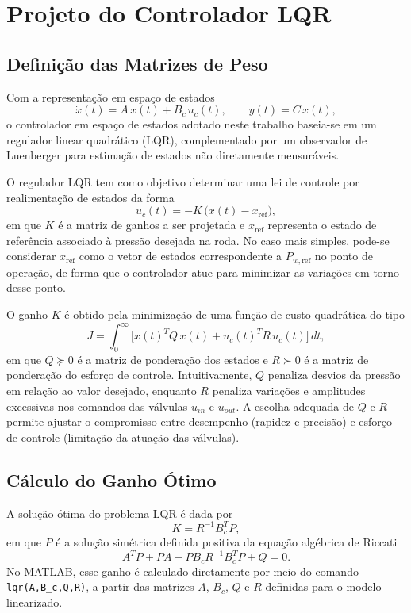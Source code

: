 \section{Projeto do Controlador LQR}
\label{sec:controle-lqr-luenberger}

\subsection{Definição das Matrizes de Peso}
\label{sec:definicao-matrizes-peso}

Com a representação em espaço de estados
\[
    \dot{x}(t) = A\,x(t) + B_c\,u_c(t), \qquad
    y(t) = C\,x(t),
\]
o controlador em espaço de estados adotado neste trabalho baseia-se em um regulador linear quadrático (LQR), complementado por um observador de Luenberger para estimação de estados não diretamente mensuráveis.

O regulador LQR tem como objetivo determinar uma lei de controle por realimentação de estados da forma
\[
    u_c(t) = -K\,\big(x(t) - x_{\text{ref}}\big),
\]
em que $K$ é a matriz de ganhos a ser projetada e $x_{\text{ref}}$ representa o estado de referência associado à pressão desejada na roda. No caso mais simples, pode-se considerar $x_{\text{ref}}$ como o vetor de estados correspondente a $P_{w,\text{ref}}$ no ponto de operação, de forma que o controlador atue para minimizar as variações em torno desse ponto.

O ganho $K$ é obtido pela minimização de uma função de custo quadrática do tipo
\[
    J = \int_{0}^{\infty}
        \Big[
            x(t)^{T} Q\,x(t)
            + u_c(t)^{T} R\,u_c(t)
        \Big]\,dt,
\]
em que $Q \succeq 0$ é a matriz de ponderação dos estados e $R \succ 0$ é a matriz de ponderação do esforço de controle. Intuitivamente, $Q$ penaliza desvios da pressão em relação ao valor desejado, enquanto $R$ penaliza variações e amplitudes excessivas nos comandos das válvulas $u_{in}$ e $u_{out}$. A escolha adequada de $Q$ e $R$ permite ajustar o compromisso entre desempenho (rapidez e precisão) e esforço de controle (limitação da atuação das válvulas).

\subsection{Cálculo do Ganho Ótimo}
\label{sec:calculo-ganho-otimo}

A solução ótima do problema LQR é dada por
\[
    K = R^{-1} B_c^{T} P,
\]
em que $P$ é a solução simétrica definida positiva da equação algébrica de Riccati
\[
    A^{T} P + P A - P B_c R^{-1} B_c^{T} P + Q = 0.
\]
No MATLAB, esse ganho é calculado diretamente por meio do comando \texttt{lqr(A,B\_c,Q,R)}, a partir das matrizes $A$, $B_c$, $Q$ e $R$ definidas para o modelo linearizado.

